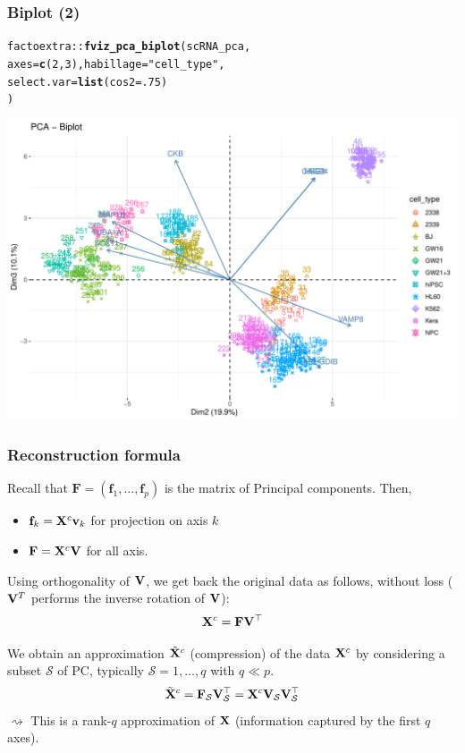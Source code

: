 \documentclass{beamer}\usepackage[]{graphicx}\usepackage[]{color}
\makeatletter
\newcommand{\hlnum}[1]{\textcolor[rgb]{0.686,0.059,0.569}{#1}}%
\newcommand{\hlstr}[1]{\textcolor[rgb]{0.192,0.494,0.8}{#1}}%
\newcommand{\hlopt}[1]{\textcolor[rgb]{0,0,0}{#1}}%
\newcommand{\hlstd}[1]{\textcolor[rgb]{0.345,0.345,0.345}{#1}}%
\newcommand{\hlkwc}[1]{\textcolor[rgb]{0.333,0.667,0.333}{#1}}%
\newcommand{\hlkwd}[1]{\textcolor[rgb]{0.737,0.353,0.396}{\textbf{#1}}}%
\newenvironment{kframe}{%
 \def\at@end@of@kframe{}%
 \ifinner\ifhmode%
  \def\at@end@of@kframe{\end{minipage}}%
  \begin{minipage}{\columnwidth}%
 \fi\fi%
 \def\FrameCommand##1{\hskip\@totalleftmargin \hskip-\fboxsep
 \colorbox{shadecolor}{##1}\hskip-\fboxsep
     \hskip-\linewidth \hskip-\@totalleftmargin \hskip\columnwidth}%
 \MakeFramed {\advance\hsize-\width
   \@totalleftmargin\z@ \linewidth\hsize
   \@setminipage}}%
 {\par\unskip\endMakeFramed%
 \at@end@of@kframe}
\newenvironment{knitrout}{}{} %
\makeatother
\begin{document}
\begin{frame}[fragile]
  \frametitle{Biplot (2)}
\begin{knitrout}\scriptsize
{}\color{fgcolor}\begin{kframe}
\begin{alltt}
  \hlstd{factoextra}\hlopt{::}\hlkwd{fviz_pca_biplot}\hlstd{(scRNA_pca,}
    \hlkwc{axes} \hlstd{=} \hlkwd{c}\hlstd{(}\hlnum{2}\hlstd{,}\hlnum{3}\hlstd{),} \hlkwc{habillage} \hlstd{=} \hlstr{"cell_type"}\hlstd{,}
    \hlkwc{select.var} \hlstd{=} \hlkwd{list}\hlstd{(}\hlkwc{cos2} \hlstd{=} \hlnum{.75}\hlstd{)}
  \hlstd{)}
\end{alltt}
\end{kframe}
\includegraphics[width=.8\textwidth]{figures/biplot2_scRNA_untransformed-1} 
\end{knitrout}
\end{frame}

\begin{frame}
  \frametitle{Reconstruction formula}

    Recall that $\mathbf{F} = (\mathbf{f}_1, \dots, \mathbf{f}_p) $ is the matrix of Principal components. Then,  
    \begin{itemize}
      \item  $\mathbf{f}_k = \mathbf{X}^c \mathbf{v}_k$ for projection on axis $k$
      \item $\mathbf{F} = \mathbf{X}^c \mathbf{V}$ for all axis.
    \end{itemize}
    Using orthogonality of $\mathbf{V}$, we get back the original data as follows, without loss ($\mathbf{V}^T$ performs the inverse rotation of $\mathbf{V}$):
    \begin{equation*}
      \mathbf{X}^c = \mathbf{F}\mathbf{V}^\top 
    \end{equation*}

    \vfill
    \pause

    We obtain an approximation $\tilde{\mathbf{X}}^c$ (compression) of the data $\mathbf{X}^c$ by considering a subset $\mathcal{S}$ of PC, typically $\mathcal{S} = {1, \dots, q}$ with $q \ll p$.
    \begin{equation*}
      \tilde{\mathbf{X}}^c = \mathbf{F}_{\mathcal{S}}\mathbf{V}_{\mathcal{S}}^\top = \mathbf{X}^c \mathbf{V}_{\mathcal{S}} \mathbf{V}_{\mathcal{S}}^\top
    \end{equation*}
    $\rightsquigarrow$ This is a rank-$q$ approximation of $\mathbf{X}$ (information captured by the first $q$ axes).

\end{frame}
\end{document}
